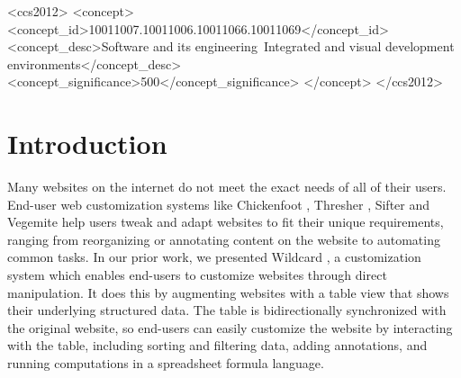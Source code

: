\documentclass[sigconf,10pt]{acmart}
\begin{document}
\begin{CCSXML}
<ccs2012>
<concept>
<concept_id>10011007.10011006.10011066.10011069</concept_id>
<concept_desc>Software and its engineering~Integrated and visual development environments</concept_desc>
<concept_significance>500</concept_significance>
</concept>
</ccs2012>
\end{CCSXML}




\maketitle

\hypertarget{sec:introduction}{%
\section{Introduction}\label{sec:introduction}}

Many websites on the internet do not meet the exact needs of all of
their users. End-user web customization systems like Chickenfoot
\citep{bolin2005}, Thresher \citep{hogue2005}, Sifter \citep{huynh2006}
and Vegemite \citep{lin2009} help users tweak and adapt websites to fit
their unique requirements, ranging from reorganizing or annotating
content on the website to automating common tasks. In our prior work, we
presented Wildcard \citep{litt2020a}, a customization system which
enables end-users to customize websites through direct manipulation. It
does this by augmenting websites with a table view that shows their
underlying structured data. The table is bidirectionally synchronized
with the original website, so end-users can easily customize the website
by interacting with the table, including sorting and filtering data,
adding annotations, and running computations in a spreadsheet formula
language.
\end{document}
